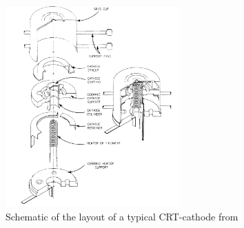 \begin{figure}
	\centering
	\includegraphics[width=0.6\textwidth]{Chapters/CRT-Basics/Cathode_layout}
	\caption{Schematic of the layout of a typical CRT-cathode from \cite{deVere69}}
	\label{fig:cathodelayout}
\end{figure}














